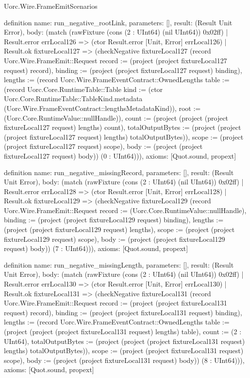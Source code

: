 \begin{lexlean}{Uorc.Wire.FrameEmitScenarios}
\begin{semanticmodule}
definition{
  name: run_negative_rootLink,
  parameters: [],
  result: (Result Unit Error),
  body: (match (rawFixture (cons (2 : UInt64) (nil UInt64)) 0x02ff)
    | Result.error errLocal126 => (ctor Result.error [Unit, Error] errLocal126)
    | Result.ok fixtureLocal127 => (checkNegative fixtureLocal127 (record Uorc.Wire.FrameEmit::Request {record := (project (project fixtureLocal127 request) record), binding := (project (project fixtureLocal127 request) binding), lengths := (record Uorc.Wire.FrameEventContract::OwnedLengths {table := (record Uorc.Core.RuntimeTable::Table {kind := (ctor Uorc.Core.RuntimeTable::TableKind.metadata (Uorc.Wire.FrameEventContract::lengthsMetadataKind)), root := (Uorc.Core.RuntimeValue::nullHandle)}), count := (project (project (project fixtureLocal127 request) lengths) count), totalOutputBytes := (project (project (project fixtureLocal127 request) lengths) totalOutputBytes)}), scope := (project (project fixtureLocal127 request) scope), body := (project (project fixtureLocal127 request) body)}) (0 : UInt64))),
  axioms: [Quot.sound, propext]
}

definition{
  name: run_negative_missingRecord,
  parameters: [],
  result: (Result Unit Error),
  body: (match (rawFixture (cons (2 : UInt64) (nil UInt64)) 0x02ff)
    | Result.error errLocal128 => (ctor Result.error [Unit, Error] errLocal128)
    | Result.ok fixtureLocal129 => (checkNegative fixtureLocal129 (record Uorc.Wire.FrameEmit::Request {record := (Uorc.Core.RuntimeValue::nullHandle), binding := (project (project fixtureLocal129 request) binding), lengths := (project (project fixtureLocal129 request) lengths), scope := (project (project fixtureLocal129 request) scope), body := (project (project fixtureLocal129 request) body)}) (7 : UInt64))),
  axioms: [Quot.sound, propext]
}

definition{
  name: run_negative_missingLength,
  parameters: [],
  result: (Result Unit Error),
  body: (match (rawFixture (cons (2 : UInt64) (nil UInt64)) 0x02ff)
    | Result.error errLocal130 => (ctor Result.error [Unit, Error] errLocal130)
    | Result.ok fixtureLocal131 => (checkNegative fixtureLocal131 (record Uorc.Wire.FrameEmit::Request {record := (project (project fixtureLocal131 request) record), binding := (project (project fixtureLocal131 request) binding), lengths := (record Uorc.Wire.FrameEventContract::OwnedLengths {table := (project (project (project fixtureLocal131 request) lengths) table), count := (2 : UInt64), totalOutputBytes := (project (project (project fixtureLocal131 request) lengths) totalOutputBytes)}), scope := (project (project fixtureLocal131 request) scope), body := (project (project fixtureLocal131 request) body)}) (8 : UInt64))),
  axioms: [Quot.sound, propext]
}


\end{semanticmodule}
\end{lexlean}
